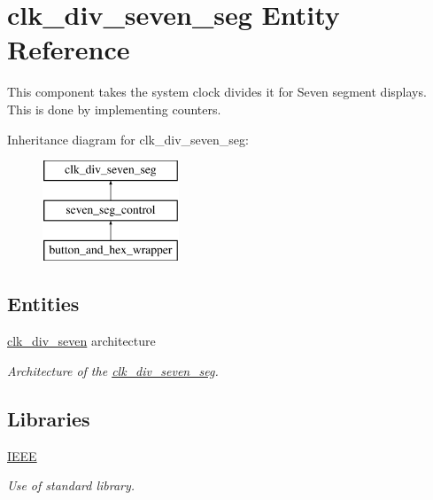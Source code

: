 \hypertarget{classclk__div__seven__seg}{\section{clk\-\_\-div\-\_\-seven\-\_\-seg Entity Reference}
\label{classclk__div__seven__seg}
}


This component takes the system clock divides it for Seven segment displays. This is done by implementing counters.  


Inheritance diagram for clk\-\_\-div\-\_\-seven\-\_\-seg\-:\begin{figure}[H]
\begin{center}
\leavevmode
\includegraphics[height=3.000000cm]{classclk__div__seven__seg}
\end{center}
\end{figure}
\subsection*{Entities}
\begin{DoxyCompactItemize}
\item 
\hyperlink{classclk__div__seven__seg_1_1clk__div__seven}{clk\-\_\-div\-\_\-seven} architecture
\begin{DoxyCompactList}\small\item\em Architecture of the \hyperlink{classclk__div__seven__seg}{clk\-\_\-div\-\_\-seven\-\_\-seg}. \end{DoxyCompactList}\end{DoxyCompactItemize}
\subsection*{Libraries}
 \begin{DoxyCompactItemize}
\item 
\hypertarget{classclk__div__seven__seg_ae4f03c286607f3181e16b9aa12d0c6d4}{\hyperlink{classclk__div__seven__seg_ae4f03c286607f3181e16b9aa12d0c6d4}{I\-E\-E\-E} }\label{classclk__div__seven__seg_ae4f03c286607f3181e16b9aa12d0c6d4}

\begin{DoxyCompactList}\small\item\em Use of standard library. \end{DoxyCompactList}\end{DoxyCompactItemize}
